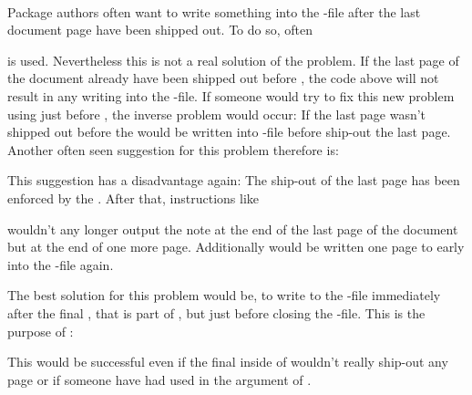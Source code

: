 \begin{Declaration}
  \\
\end{Declaration}%
%
%
Package authors often want to write something into the -file after
the last document page have been shipped out. To do so, often
\begin{lstcode}[belowskip=\dp\strutbox]
  \AtEndDocument{%
    \if@filesw
      \write\@auxout{%
        \protect\writethistoaux%
      }%
    \fi
  } 
\end{lstcode}
is used. Nevertheless this is not a real solution of the problem. If the last
page of the document already have been shipped out before
, the code above will not result in any
writing into the -file. If someone would try to fix this new problem
using  just before , the inverse problem would
occur: If the last page wasn't shipped out before
 the  would be written
into -file before ship-out the last page. Another often seen
suggestion for this problem therefore is:
\begin{lstcode}[belowskip=\dp\strutbox]
  \AtEndDocument{%
    \if@filesw
      \clearpage
      \immediate\write\@auxout{%
        \protect\writethistoaux%
      }%
    \fi
  } 
\end{lstcode}
This suggestion has a disadvantage again: The ship-out of the last page has
been enforced by the . After that, instructions like
\begin{lstcode}[belowskip=\dp\strutbox]
\end{lstcode}
wouldn't any longer output the note at the end of the last page of the
document but at the end of one more page. Additionally 
would be written one page to early into the -file again.

The best solution for this problem would be, to write to the -file
immediately after the final , that is part of
, but just before closing the
-file. This is the purpose of :
\begin{lstcode}[belowskip=\dp\strutbox]
  \BeforeClosingMainAux{%
    \if@filesw
      \immediate\write\@auxout{%
        \protect\writethistoaux%
      }%
    \fi
  }
\end{lstcode}
This would be successful even if the final  inside of
 wouldn't really ship-out any page or if
someone have had used  in the argument of
.

